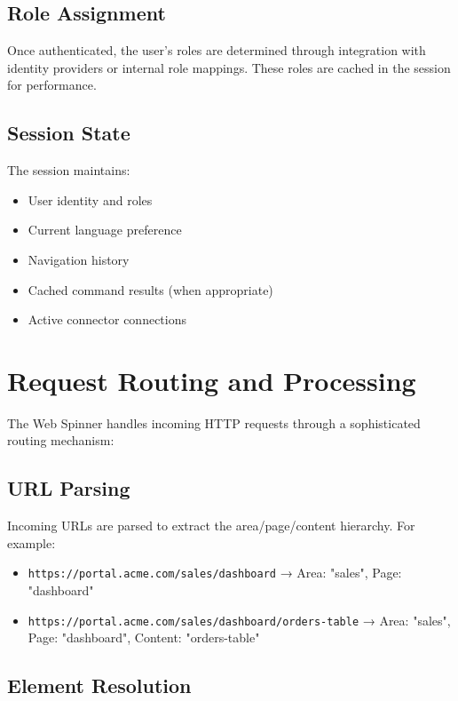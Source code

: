 \subsection{Role Assignment}

Once authenticated, the user's roles are determined through integration with identity providers or internal role mappings. These roles are cached in the session for performance.

\subsection{Session State}

The session maintains:
\begin{itemize}
	\item User identity and roles
	\item Current language preference
	\item Navigation history
	\item Cached command results (when appropriate)
	\item Active connector connections
\end{itemize}

\section{Request Routing and Processing}
\label{sec:request-routing}

The Web Spinner handles incoming HTTP requests through a sophisticated routing mechanism:

\subsection{URL Parsing}

Incoming URLs are parsed to extract the area/page/content hierarchy. For example:
\begin{itemize}
	\item \texttt{https://portal.acme.com/sales/dashboard} → Area: "sales", Page: "dashboard"
	\item \texttt{https://portal.acme.com/sales/dashboard/orders-table} → Area: "sales", Page: "dashboard", Content: "orders-table"
\end{itemize}

\subsection{Element Resolution}

